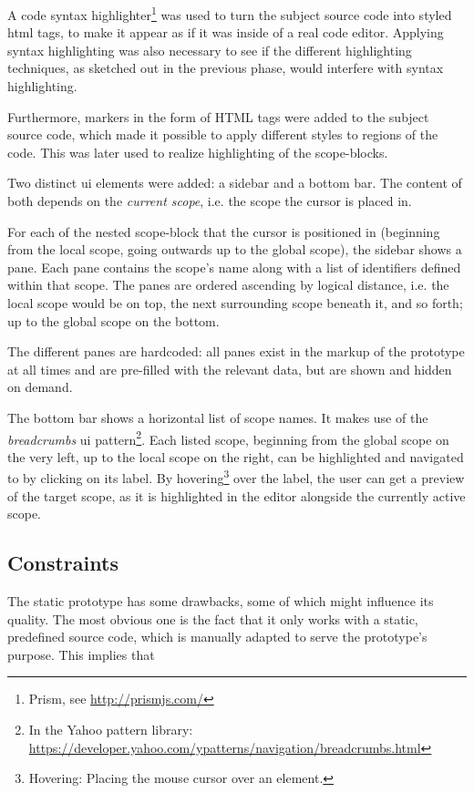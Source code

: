 A code syntax highlighter\footnote{Prism, see \url{http://prismjs.com/}}
was used to turn the subject source code into styled \ac{html} tags, to
make it appear as if it was inside of a real code editor. Applying
syntax highlighting was also necessary to see if the different
highlighting techniques, as sketched out in the previous phase, would
interfere with syntax highlighting.

Furthermore, markers in the form of HTML tags were added to the subject
source code, which made it possible to apply different
styles
to regions of the code. This was later used to realize highlighting of
the \glspl{scope-block}.

Two distinct \ac{ui} elements were added: a sidebar and a bottom bar.
The content of both depends on the \emph{current scope}, i.e. the scope
the cursor is placed in.

For each of the nested \ac{scope-block} that the cursor is positioned in
(beginning from the local scope, going outwards up to the global scope),
the sidebar shows a pane. Each pane contains the scope’s name along with
a list of identifiers defined within that scope. The panes are ordered
ascending by logical distance, i.e. the local scope would be on top, the
next surrounding scope beneath it, and so forth; up to the global scope
on the bottom.

The different panes are hardcoded: all panes exist in the markup of the
prototype at all times and are pre-filled with the relevant data, but
are shown and hidden on demand.

The bottom bar shows a horizontal list of scope names. It makes use of
the \emph{breadcrumbs} \ac{ui}
pattern\footnote{In the Yahoo pattern library: \url{https://developer.yahoo.com/ypatterns/navigation/breadcrumbs.html}}.
Each listed scope, beginning from the global scope on the very left, up
to the local scope on the right, can be highlighted and navigated to by
clicking on its label. By
hovering\footnote{Hovering: Placing the mouse cursor over an element.}
over the label, the user can get a preview of the target scope, as it is
highlighted in the editor alongside the currently active scope.

\subsection{Constraints}\label{constraints}

The static prototype has some drawbacks, some of which might influence
its quality. The most obvious one is the fact that it only works with a
static, predefined source code, which is manually adapted to serve the
prototype’s purpose. This implies that

